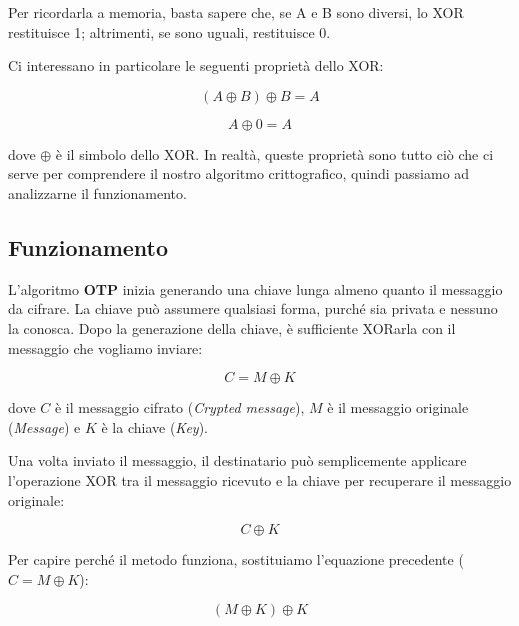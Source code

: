 \documentclass{rapport}
\begin{document}
Per ricordarla a memoria, basta sapere che, se A e B sono diversi, lo XOR restituisce 1; altrimenti, se sono uguali, restituisce 0.

Ci interessano in particolare le seguenti proprietà dello XOR:

\begin{equation*} (A \oplus B) \oplus B = A \end{equation*}

\begin{equation*} A \oplus 0 = A \end{equation*}

dove $\oplus$ è il simbolo dello XOR. In realtà, queste proprietà sono tutto ciò che ci serve per comprendere il nostro algoritmo crittografico, quindi passiamo ad analizzarne il funzionamento.















\newpage
\subsection{Funzionamento}
L'algoritmo \textbf{OTP} inizia generando una chiave lunga almeno quanto il messaggio da cifrare. La chiave può assumere qualsiasi forma, purché sia privata e nessuno la conosca. Dopo la generazione della chiave, è sufficiente XORarla con il messaggio che vogliamo inviare:  

\begin{equation*}
    C = M \oplus K 
\end{equation*}

dove \(C\) è il messaggio cifrato (\textit{Crypted message}), \(M\) è il messaggio originale (\textit{Message}) e \(K\) è la chiave (\textit{Key}).  

Una volta inviato il messaggio, il destinatario può semplicemente applicare l'operazione XOR tra il messaggio ricevuto e la chiave per recuperare il messaggio originale:  

\begin{equation*}
   C \oplus K
\end{equation*}

Per capire perché il metodo funziona, sostituiamo l'equazione precedente (\(C = M \oplus K\)):  

\begin{equation*}
    (M \oplus K) \oplus K
\end{equation*}
\end{document}
